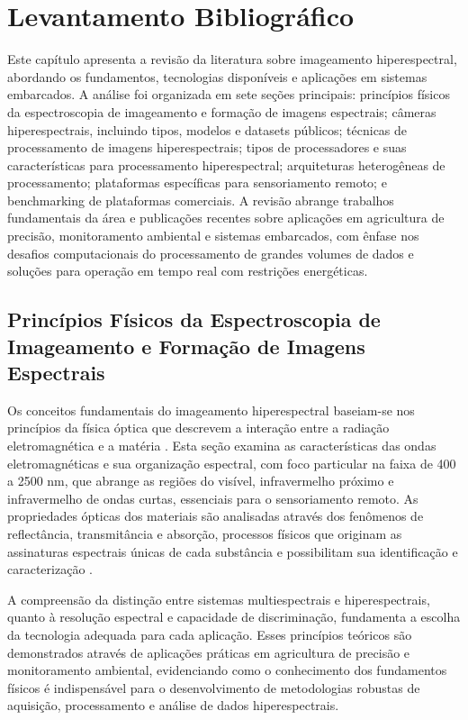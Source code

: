 \chapter{Levantamento Bibliográfico}\label{chp:levantamento}

Este capítulo apresenta a revisão da literatura sobre imageamento
hiperespectral, abordando os fundamentos, tecnologias disponíveis e
aplicações em sistemas embarcados. A análise foi organizada em sete
seções principais: princípios físicos da espectroscopia de imageamento
e formação de imagens espectrais; câmeras hiperespectrais, incluindo
tipos, modelos e datasets públicos; técnicas de processamento de
imagens hiperespectrais; tipos de processadores e suas características
para processamento hiperespectral; arquiteturas heterogêneas de
processamento; plataformas específicas para sensoriamento remoto; e
benchmarking de plataformas comerciais. A revisão abrange trabalhos
fundamentais da área e publicações recentes sobre aplicações em
agricultura de precisão, monitoramento ambiental e sistemas embarcados,
com ênfase nos desafios computacionais do processamento de grandes
volumes de dados e soluções para operação em tempo real com
restrições energéticas.

\section{Princípios Físicos da Espectroscopia de Imageamento e
    Formação de Imagens Espectrais}
\label{sec:fundamentos_espectro}

Os conceitos fundamentais do imageamento hiperespectral baseiam-se nos
princípios da física óptica que descrevem a interação entre a radiação
eletromagnética e a matéria \cite{Lorenzzetti2015}. Esta seção examina
as características das ondas eletromagnéticas e sua organização
espectral, com foco particular na faixa de 400 a 2500 nm, que abrange
as regiões do visível, infravermelho próximo e infravermelho de ondas
curtas, essenciais para o sensoriamento remoto. As propriedades ópticas
dos materiais são analisadas através dos fenômenos de reflectância,
transmitância e absorção, processos físicos que originam as assinaturas
espectrais únicas de cada substância e possibilitam sua identificação e
caracterização \cite{Baptista2019}.

A compreensão da distinção entre sistemas multiespectrais e
hiperespectrais, quanto à resolução espectral e capacidade de
discriminação, fundamenta a escolha da tecnologia adequada para cada
aplicação. Esses princípios teóricos são demonstrados através de
aplicações práticas em agricultura de precisão e monitoramento
ambiental, evidenciando como o conhecimento dos fundamentos físicos é
indispensável para o desenvolvimento de metodologias robustas de
aquisição, processamento e análise de dados hiperespectrais.

